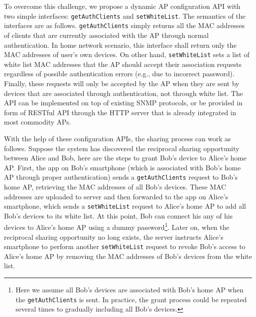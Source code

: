 To overcome this challenge, we propose a dynamic \wifi{} AP configuration API
with two simple interfaces: \texttt{getAuthClients} and \texttt{setWhiteList}.
The semantics of the interfaces are as follows.  \texttt{getAuthClients} simply
returns all the MAC addresses of clients that are currently associated with the
AP through normal authentication. In home \wifi{} network scenario, this
interface shall return only the MAC addresses of user's own \wifi{} devices.  On
other hand, \texttt{setWhiteList} sets a list of white list MAC addresses that
the AP should accept their association requests regardless of possible
authentication errors (e.g., due to incorrect \wifi{} password). Finally, these
requests will only be accepted by the AP when they are sent by devices that are
associated through authentication, not through white list. The API can be
implemented on top of existing SNMP protocols, or be provided in form of RESTful
API through the HTTP server that is already integrated in most commodity APs.

With the help of these configuration APIs, the \wifi{} sharing process can work
as follows. Suppose the \wisefi{} system has discovered the reciprocal sharing
opportunity between Alice and Bob, here are the steps to grant Bob's device to
Alice's home AP. First, the \wisefi{} app on Bob's smartphone (which is
associated with Bob's home AP through proper authentication) sends a
\texttt{getAuthClients} request to Bob's home AP, retrieving the MAC addresses
of all Bob's devices. These MAC addresses are uploaded to \wisefi{} server and
then forwarded to the \wisefi{} app on Alice's smartphone, which sends a
\texttt{setWhiteList} request to Alice's home AP to add all Bob's devices to its
white list. At this point, Bob can connect his any of his devices to Alice's
home AP using a dummy password\footnote{Here we assume all Bob's devices are
associated with Bob's home AP when the \texttt{getAuthClients} is sent. In
practice, the grant process could be repeated several times to gradually
including all Bob's devices.}. Later on, when the reciprocal sharing
opportunity no long exists, the \wisefi{} server instructs Alice's smartphone to
perform another \texttt{setWhiteList} request to revoke Bob's access to Alice's
home AP by removing the MAC addresses of Bob's devices from the white list.

